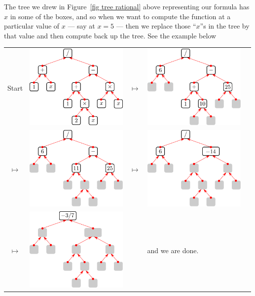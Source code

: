 The tree we drew in Figure~\ref{fig tree rational} above representing our formula has $x$
in some of the boxes,
and so when we want to compute the function at a particular value of $x$ --- say
at $x=5$ --- then we replace those ``$x$''s in the tree by that value and then
compute back up the tree. See the example below
\begin{fig}
\begin{center}
\begin{tabular}{c m{55mm} c m{55mm} c}
  Start
  & \includegraphics[width=50mm]{tree1b}
  & $\mapsto$
  & \includegraphics[width=50mm]{tree1b2}
  &
  \\[15ex]
  $\mapsto$
  & \includegraphics[width=50mm]{tree1b3}
  & $\mapsto$
  & \includegraphics[width=50mm]{tree1b4}
  & \\[15ex]
  $\mapsto$
  & \includegraphics[width=50mm]{tree1b5}
  & & and we are done.
\end{tabular}
\end{center}
\end{fig}

